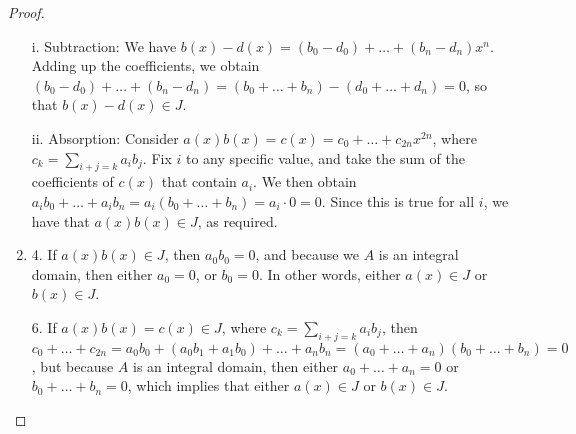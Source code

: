 \begin{proof}
\begin{enumerate}
    i. Subtraction: We have $b(x)-d(x)=(b_0-d_0)+\dots+(b_n-d_n)x^n$. Adding up the coefficients, we obtain $(b_0-d_0)+\dots+(b_n-d_n)= (b_0+\dots+b_n)-(d_0+\dots+d_n)=0$, so that $b(x)-d(x)\in J$.
    
    ii. Absorption: Consider $a(x)b(x)= c(x)= c_0+\dots+c_{2n}x^{2n}$, where $c_k=\sum_{i+j=k}a_ib_j$. Fix $i$ to any specific value, and take the sum of the coefficients of $c(x)$ that contain $a_i$. We then obtain $a_ib_0+\dots+a_ib_n= a_i(b_0+\dots+b_n)=a_i\cdot 0= 0$. Since this is true for all $i$, we have that $a(x)b(x)\in J$, as required.
    \item 4. If $a(x)b(x)\in J$, then $a_0b_0=0$, and because we $A$ is an integral domain, then either $a_0=0$, or $b_0=0$. In other words, either $a(x)\in J$ or $b(x)\in J$.
    
    6. If $a(x)b(x)=c(x)\in J$, where $c_k=\sum_{i+j=k}a_ib_j$, then $c_0+\dots+c_{2n}= a_0b_0+(a_0b_1+a_1b_0)+\dots+a_nb_n= (a_0+\dots+a_n)(b_0+\dots+b_n)= 0$, but because $A$ is an integral domain, then either $a_0+\dots+a_n=0$ or $b_0+\dots+b_n=0$, which implies that either $a(x)\in J$ or $b(x)\in J$.
\end{enumerate}
\end{proof}

